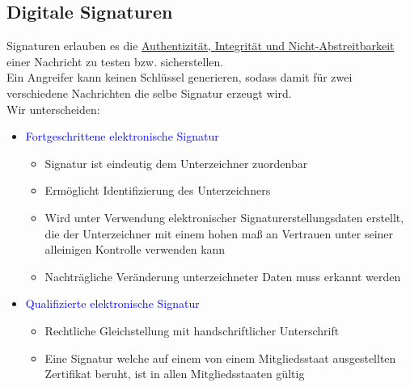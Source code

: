 \documentclass[a4paper,12pt,leqno]{article}
\newcommand{\blue}[1]{\textcolor{blue}{#1}}
\begin{document}
\subsection{Digitale Signaturen}
Signaturen erlauben es die \hyperref[item:schutzziele]{Authentizität, Integrität und Nicht-Abstreitbarkeit} einer Nachricht zu testen bzw. sicherstellen.\\
Ein Angreifer kann keinen Schlüssel generieren, sodass damit für zwei verschiedene Nachrichten die selbe Signatur erzeugt wird.\\
Wir unterscheiden:
\begin{itemize}
\item \blue{Fortgeschrittene elektronische Signatur}
	\begin{itemize}
	\item Signatur ist eindeutig dem Unterzeichner zuordenbar
	\item Ermöglicht Identifizierung des Unterzeichners
	\item Wird unter Verwendung elektronischer Signaturerstellungsdaten erstellt, die der Unterzeichner mit einem hohen maß an Vertrauen unter seiner alleinigen Kontrolle verwenden kann
	\item Nachträgliche Veränderung unterzeichneter Daten muss erkannt werden
	\end{itemize}
\item \blue{Qualifizierte elektronische Signatur}
	\begin{itemize}
	\item Rechtliche Gleichstellung mit handschriftlicher Unterschrift
	\item Eine Signatur welche auf einem von einem Mitgliedsstaat ausgestellten Zertifikat beruht, ist in allen Mitgliedsstaaten gültig
	\end{itemize}	
\end{itemize}
\end{document}
